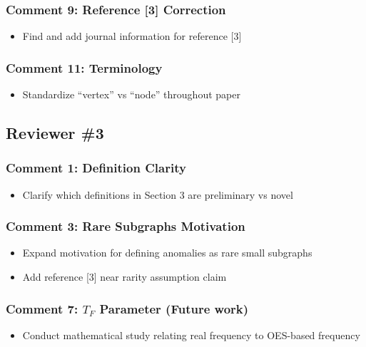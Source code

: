 \subsubsection*{Comment 9: Reference [3] Correction}
\begin{itemize}
    \item[$\square$] Find and add journal information for reference [3]
\end{itemize}

\subsubsection*{Comment 11: Terminology}
\begin{itemize}
    \item[$\square$] Standardize ``vertex'' vs ``node'' throughout paper
\end{itemize}

\subsection*{Reviewer \#3}

\subsubsection*{Comment 1: Definition Clarity}
\begin{itemize}
    \item[$\square$] Clarify which definitions in Section 3 are preliminary vs novel
\end{itemize}

\subsubsection*{Comment 3: Rare Subgraphs Motivation}
\begin{itemize}
    \item[$\square$] Expand motivation for defining anomalies as rare small subgraphs
    \item[$\square$] Add reference [3] near rarity assumption claim
\end{itemize}

\subsubsection*{Comment 7: $T_F$ Parameter (Future work)}
\begin{itemize}
    \item[$\square$] Conduct mathematical study relating real frequency to OES-based frequency
\end{itemize}

